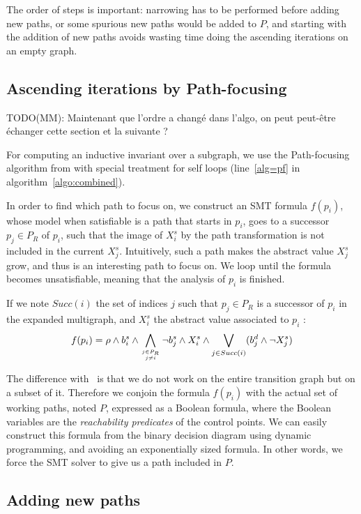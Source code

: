 \documentclass[preprint]{sigplanconf}
\newcommand{\MM}[1]{{\color{blue} TODO(MM): #1}}
\begin{document}
The order of steps is important: narrowing has to be performed before
adding new paths, or some spurious new paths would be added to $P$,
and starting with the addition of new paths avoids wasting time
doing the ascending iterations on an empty graph.

\subsection{Ascending iterations by Path-focusing}
\label{subsec:ascending}

\MM{Maintenant que l'ordre a changé dans l'algo, on peut peut-être
  échanger cette section et la suivante ?}

For computing an inductive invariant over a subgraph, we use the
Path-focusing algorithm from \citet{Monniaux_Gonnord_SAS11} with special
treatment for self loops (line~\ref{alg=pf} in algorithm~\ref{algo:combined}).

In order to find which path to focus on, we construct an SMT formula $f(p_i)$, whose
model when satisfiable is a path that starts in $p_i$, goes to a successor $p_j
\in P_R$ of $p_i$, such that the image of $X_{i}^s$ by the path transformation
is not included in the current $X_{j}^s$.
Intuitively, such a path makes the abstract value $X_{j}^s$ grow, and thus is
an interesting path to focus on. We loop until the formula becomes unsatisfiable,
meaning that the analysis of $p_i$ is finished.

If we note $Succ(i)$ the set of indices $j$ such that $p_j \in P_R$ is a
successor of $p_i$ in the expanded multigraph, and $X_i^s$ the abstract value
associated to $p_i$ :
$$f(p_i) = \rho \wedge b_i^s \wedge 
\displaystyle\bigwedge_{j \in P_R \atop j \neq i} \neg
b_j^s \wedge X_i^s \wedge \displaystyle\bigvee_{j \in Succ(i)} (b_j^d \wedge
 \neg X_j^s)$$

The difference with~\citet{Monniaux_Gonnord_SAS11} is that we do not
work on the entire transition graph but on a subset of it. Therefore we
conjoin the formula $f(p_i)$ with the actual set of working paths,
noted $P$, expressed as a Boolean formula, where the Boolean variables are the
\emph{reachability predicates} of the control points. We can easily construct
this formula from the binary decision diagram using dynamic programming, and
avoiding an exponentially sized formula. In other words, we force the SMT solver
to give us a path included in $P$.


\subsection{Adding new paths}
\label{subsec:addingpaths}
\end{document}

